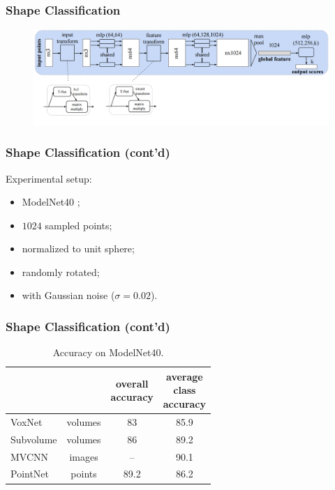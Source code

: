 \documentclass[14pt]{beamer}
\begin{document}
  \begin{frame}
    \frametitle{Shape Classification}
    \begin{figure}
      \centering
      \hspace*{-0.5cm}\includegraphics[scale=0.3]{classification_network}
    \end{figure}  
  \end{frame}
  
  \begin{frame}
    \frametitle{Shape Classification (cont'd)}
    Experimental setup:
    \begin{itemize}
      \item ModelNet40 \cite{Wu:2014};
      \item $1024$ sampled points;
      \item normalized to unit sphere;
      \item randomly rotated;
      \item with Gaussian noise ($\sigma = 0.02$).
    \end{itemize}
  \end{frame}
  
  \begin{frame}
    \frametitle{Shape Classification (cont'd)}
    \begin{table}
      {\renewcommand*{\arraystretch}{1}
      \begin{tabular}{l | c | c c}
        &  & \makecell{overall\\accuracy} & \makecell{average\\class\\accuracy}\\\hline
        VoxNet \cite{Maturana:2015} & volumes & 83 & 85.9\\
        Subvolume \cite{Qi:2016} & volumes & 86 & 89.2\\
        MVCNN \cite{Su:2015} & images & -- & 90.1\\
        PointNet & points & 89.2 & 86.2\\
      \end{tabular}
      }
      \caption{Accuracy on ModelNet40.}
    \end{table}
  \end{frame}
  
\end{document}
